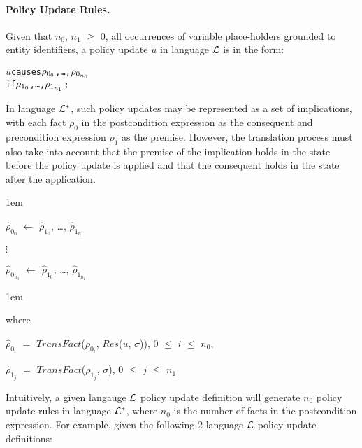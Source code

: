 \documentclass[11pt]{report}
\newenvironment{vverbatim}
{
  \begin{alltt}
}
{
    \vspace{-\baselineskip}
  \end{alltt}
}
\newenvironment{vquote}
{
  \begin{list}{}{\leftmargin 1em}\item[]
}
{
  \end{list}
}
\begin{document}
          \paragraph{Policy Update Rules.}
            
            Given that $n_0$, $n_1$ $\geq$ $0$, all occurrences of variable
            place-holders grounded to entity identifiers, a policy update $u$
            in language ${\cal L}$ is in the form:

            \begin{vverbatim}
  \(u\) causes \(\rho\sb{0\sb{0}}\), \ldots, \(\rho\sb{0\sb{n\sb{0}}}\)
  if \(\rho\sb{1\sb{0}}\), \ldots, \(\rho\sb{1\sb{n\sb{1}}}\);
            \end{vverbatim}

            In language ${\cal L}^{*}$, such policy updates may be represented
            as a set of implications, with each fact $\rho_{0}$ in the
            postcondition expression as the consequent and precondition
            expression $\rho_{1}$ as the premise. However, the translation
            process must also take into account that the premise of the
            implication holds in the state before the policy update is applied
            and that the consequent holds in the state after the application.

            \begin{vquote}
              $\hat{\rho}_{0_{0}}$ $\leftarrow$
                $\hat{\rho}_{1_{0}}$, \ldots, $\hat{\rho}_{1_{n_1}}$

              $\vdots$

              $\hat{\rho}_{0_{n_0}}$ $\leftarrow$
                $\hat{\rho}_{1_{0}}$, \ldots, $\hat{\rho}_{1_{n_1}}$
            \end{vquote}

            \begin{vquote}
              where

              \hspace{1em}
              $\hat{\rho}_{0_i}$ $=$
                $TransFact$($\rho_{0_i}$, $Res$($u$, $\sigma$)),
                $0$ $\leq$ $i$ $\leq$ $n_0$,

              \hspace{1em}
              $\hat{\rho}_{1_j}$ $=$
                $TransFact$($\rho_{1_j}$, $\sigma$),
                $0$ $\leq$ $j$ $\leq$ $n_1$
            \end{vquote}

            Intuitively, a given langauge ${\cal L}$ policy update definition
            will generate $n_0$ policy update rules in language ${\cal L^{*}}$,
            where $n_0$ is the number of facts in the postcondition expression.
            For example, given the following 2 language ${\cal L}$ policy
            update definitions:
\end{document}
